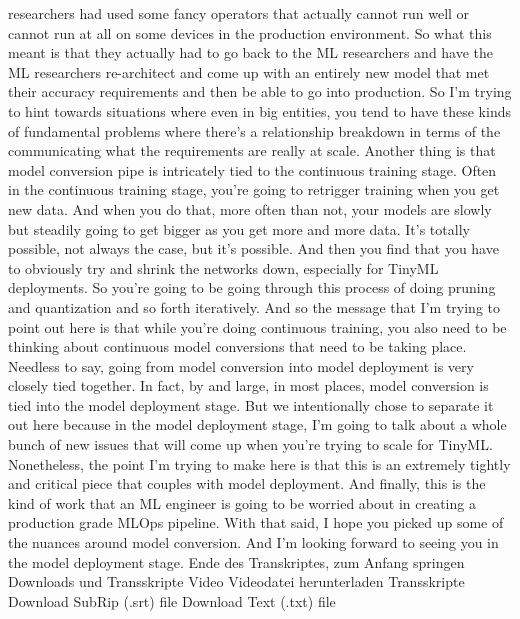 {{{{{    researchers had used some fancy operators that actually cannot run well
    or cannot run at all on some devices in the production environment.
    So what this meant is that they actually had to go back to the ML researchers
    and have the ML researchers re-architect and come up
    with an entirely new model that met their accuracy requirements
    and then be able to go into production.
    So I'm trying to hint towards situations where even in big entities,
    you tend to have these kinds of fundamental problems
    where there's a relationship breakdown in terms of the communicating what
    the requirements are really at scale.
    Another thing is that model conversion pipe is intricately
    tied to the continuous training stage.
    Often in the continuous training stage, you're
    going to retrigger training when you get new data.
    And when you do that, more often than not,
    your models are slowly but steadily going
    to get bigger as you get more and more data.
    It's totally possible, not always the case, but it's possible.
    And then you find that you have to obviously
    try and shrink the networks down, especially for TinyML deployments.
    So you're going to be going through this process of doing
    pruning and quantization and so forth iteratively.
    And so the message that I'm trying to point out here
    is that while you're doing continuous training,
    you also need to be thinking about continuous model conversions that
    need to be taking place.
    Needless to say, going from model conversion into model
    deployment is very closely tied together.
    In fact, by and large, in most places, model conversion
    is tied into the model deployment stage.
    But we intentionally chose to separate it out here
    because in the model deployment stage, I'm
    going to talk about a whole bunch of new issues
    that will come up when you're trying to scale for TinyML.
    Nonetheless, the point I'm trying to make here
    is that this is an extremely tightly and critical piece that
    couples with model deployment.
    And finally, this is the kind of work that an ML engineer
    is going to be worried about in creating a production grade MLOps pipeline.
    With that said, I hope you picked up some of the nuances
    around model conversion.
    And I'm looking forward to seeing you in the model deployment stage.
    Ende des Transkriptes, zum Anfang springen
    Downloads und Transskripte
    Video
    Videodatei herunterladen
    Transskripte
    Download SubRip (.srt) file
    Download Text (.txt) file 
    
}}}}}
